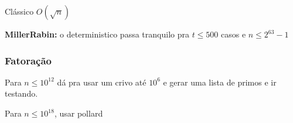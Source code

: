 Clássico $O(\sqrt{n})$


\textbf{MillerRabin:} o deterministico passa tranquilo pra $t \leq 500$ casos e $n \leq 2^{63} - 1$


\subsubsection{Fatoração}

Para $n \leq 10^{12}$ dá pra usar um crivo até $10^6$ e gerar uma lista de primos e ir testando.

Para $n \leq 10^{18}$, usar pollard

